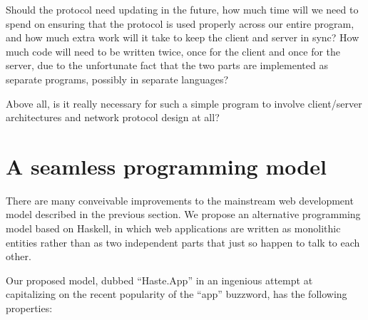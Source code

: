 \documentclass[preprint]{sigplanconf}
\begin{document}
Should the protocol need updating in the future, how much time will we need to
spend on ensuring that the protocol is used properly across our entire program,
and how much extra work will it take to keep the client and server in sync?
How much code will need to be written twice, once for the client and once for
the server, due to the unfortunate fact that the two parts are implemented as
separate programs, possibly in separate languages?

Above all, is it really necessary for such a simple program to involve
client/server architectures and network protocol design at all?

\section{A seamless programming model}

There are many conveivable improvements to the mainstream web development model
described in the previous section. We propose an alternative programming model
based on Haskell, in which web applications are written as monolithic entities
rather than as two independent parts that just so happen to talk to each other.

Our proposed model, dubbed ``Haste.App'' in an ingenious attempt at
capitalizing on the recent popularity of the ``app'' buzzword, has the
following properties:
\end{document}
